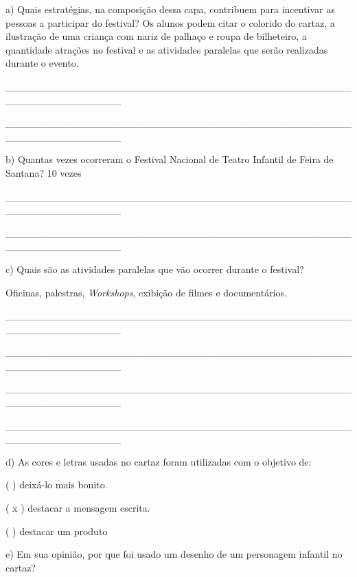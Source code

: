 \begin{itemize}
{{{\begin{itemize}
\begin{itemize}
a) Quais estratégias, na composição dessa capa, contribuem para
incentivar as pessoas a participar do festival? Os alunos podem citar o
colorido do cartaz, a ilustração de uma criança com nariz de palhaço e
roupa de bilheteiro, a quantidade atrações no festival e as atividades
paralelas que serão realizadas durante o evento.

\protect\hypertarget{_Hlk127604103}{}{}\_\_\_\_\_\_\_\_\_\_\_\_\_\_\_\_\_\_\_\_\_\_\_\_\_\_\_\_\_\_\_\_\_\_\_\_\_\_\_\_\_\_\_\_\_\_\_\_\_\_\_\_\_\_\_\_\_\_\_\_\_\_\_\_

\_\_\_\_\_\_\_\_\_\_\_\_\_\_\_\_\_\_\_\_\_\_\_\_\_\_\_\_\_\_\_\_\_\_\_\_\_\_\_\_\_\_\_\_\_\_\_\_\_\_\_\_\_\_\_\_\_\_\_\_\_\_\_\_

b) Quantas vezes ocorreram o Festival Nacional de Teatro Infantil de
Feira de Santana? 10 vezes

\_\_\_\_\_\_\_\_\_\_\_\_\_\_\_\_\_\_\_\_\_\_\_\_\_\_\_\_\_\_\_\_\_\_\_\_\_\_\_\_\_\_\_\_\_\_\_\_\_\_\_\_\_\_\_\_\_\_\_\_\_\_\_\_

\_\_\_\_\_\_\_\_\_\_\_\_\_\_\_\_\_\_\_\_\_\_\_\_\_\_\_\_\_\_\_\_\_\_\_\_\_\_\_\_\_\_\_\_\_\_\_\_\_\_\_\_\_\_\_\_\_\_\_\_\_\_\_\_

c) Quais são as atividades paralelas que vão ocorrer durante o festival?

Oficinas, palestras, \emph{Workshops}, exibição de filmes e
documentários.

\protect\hypertarget{_Hlk129074226}{}{}\_\_\_\_\_\_\_\_\_\_\_\_\_\_\_\_\_\_\_\_\_\_\_\_\_\_\_\_\_\_\_\_\_\_\_\_\_\_\_\_\_\_\_\_\_\_\_\_\_\_\_\_\_\_\_\_\_\_\_\_\_\_\_\_

\_\_\_\_\_\_\_\_\_\_\_\_\_\_\_\_\_\_\_\_\_\_\_\_\_\_\_\_\_\_\_\_\_\_\_\_\_\_\_\_\_\_\_\_\_\_\_\_\_\_\_\_\_\_\_\_\_\_\_\_\_\_\_\_

\_\_\_\_\_\_\_\_\_\_\_\_\_\_\_\_\_\_\_\_\_\_\_\_\_\_\_\_\_\_\_\_\_\_\_\_\_\_\_\_\_\_\_\_\_\_\_\_\_\_\_\_\_\_\_\_\_\_\_\_\_\_\_\_

\_\_\_\_\_\_\_\_\_\_\_\_\_\_\_\_\_\_\_\_\_\_\_\_\_\_\_\_\_\_\_\_\_\_\_\_\_\_\_\_\_\_\_\_\_\_\_\_\_\_\_\_\_\_\_\_\_\_\_\_\_\_\_\_

d) As cores e letras usadas no cartaz foram utilizadas com o objetivo
de:

( ) deixá-lo mais bonito.

( x ) destacar a mensagem escrita.

( ) destacar um produto

e) Em sua opinião, por que foi usado um desenho de um personagem
infantil no cartaz?


\end{itemize}
\end{itemize}}}}
\end{itemize}
